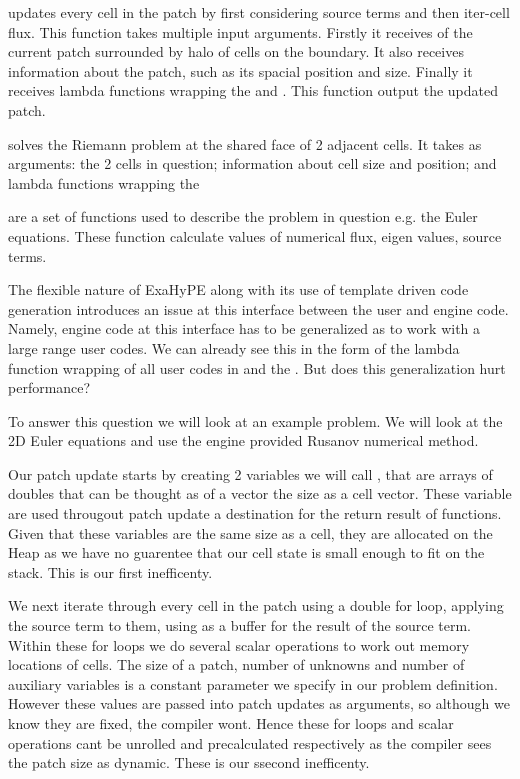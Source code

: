  updates every cell in the patch by first considering source terms and then iter-cell flux.
This function takes multiple input arguments.
Firstly it receives of the current patch surrounded by halo of cells on the boundary.
It also receives information about the patch, such as its spacial position and size.
Finally it receives lambda functions wrapping the  and . 
This function output the updated patch.  

 solves the Riemann problem at the shared face of 2 adjacent cells.
It takes as arguments: the 2 cells in question; information about cell size and position; and lambda functions wrapping the 

 are a set of functions used to describe the problem in question e.g. the Euler equations.
These function calculate values of numerical flux, eigen values, source terms.

The flexible nature of ExaHyPE along with its use of template driven code generation introduces an issue at this interface between the user and engine code.
Namely, engine code at this interface has to be generalized as to work with a large range user codes.
We can already see this in the form of the lambda function wrapping of all user codes in  and the .
But does this generalization hurt performance?

To answer this question we will look at an example problem.
We will look at the 2D Euler equations and use the engine provided Rusanov numerical method.



Our patch update starts by creating 2 variables we will call ,  that are arrays of doubles that can be thought as of a vector the size as a cell vector.
These variable are used througout patch update a destination for the return result of functions.
Given that these variables are the same size as a cell, they are allocated on the Heap as we have no guarentee that our cell state is small enough to fit on the stack.
This is our first inefficenty.

We next iterate through every cell in the patch using a double for loop, applying the source term to them, using  as a buffer for the result of the source term.
Within these for loops we do several scalar operations to work out memory locations of cells.
The size of a patch, number of unknowns and number of auxiliary variables is a constant parameter we specify in our problem definition.
However these values are passed into patch updates as arguments, so although we know they are fixed, the compiler wont. %
Hence these for loops and scalar operations cant be unrolled and precalculated respectively as the compiler sees the patch size as dynamic.
These is our ssecond inefficenty.

